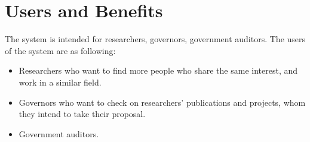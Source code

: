 \section{Users and Benefits}
\label{sec:users}
The system is intended for researchers, governors, government auditors. The users of the system are as following:
\begin{itemize}
	\item Researchers who want to find more people who share the same interest, and work in a similar field.
	\item Governors who want to check on researchers' publications and projects, whom they intend to take their proposal.
	\item Government auditors.
\end{itemize}